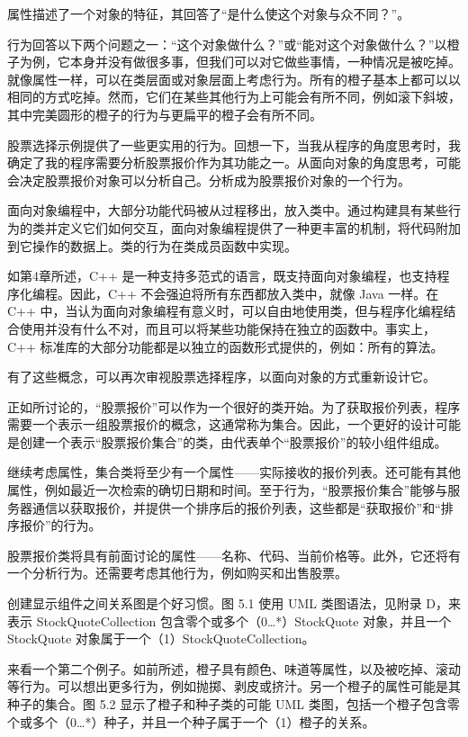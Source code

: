 属性描述了一个对象的特征，其回答了“是什么使这个对象与众不同？”。


行为回答以下两个问题之一：“这个对象做什么？”或“能对这个对象做什么？”以橙子为例，它本身并没有做很多事，但我们可以对它做些事情，一种情况是被吃掉。就像属性一样，可以在类层面或对象层面上考虑行为。所有的橙子基本上都可以以相同的方式吃掉。然而，它们在某些其他行为上可能会有所不同，例如滚下斜坡，其中完美圆形的橙子的行为与更扁平的橙子会有所不同。

股票选择示例提供了一些更实用的行为。回想一下，当我从程序的角度思考时，我确定了我的程序需要分析股票报价作为其功能之一。从面向对象的角度思考，可能会决定股票报价对象可以分析自己。分析成为股票报价对象的一个行为。

面向对象编程中，大部分功能代码被从过程移出，放入类中。通过构建具有某些行为的类并定义它们如何交互，面向对象编程提供了一种更丰富的机制，将代码附加到它操作的数据上。类的行为在类成员函数中实现。

如第4章所述，C++ 是一种支持多范式的语言，既支持面向对象编程，也支持程序化编程。因此，C++ 不会强迫将所有东西都放入类中，就像 Java 一样。在 C++ 中，当认为面向对象编程有意义时，可以自由地使用类，但与程序化编程结合使用并没有什么不对，而且可以将某些功能保持在独立的函数中。事实上，C++ 标准库的大部分功能都是以独立的函数形式提供的，例如：所有的算法。


有了这些概念，可以再次审视股票选择程序，以面向对象的方式重新设计它。

正如所讨论的，“股票报价”可以作为一个很好的类开始。为了获取报价列表，程序需要一个表示一组股票报价的概念，这通常称为集合。因此，一个更好的设计可能是创建一个表示“股票报价集合”的类，由代表单个“股票报价”的较小组件组成。

继续考虑属性，集合类将至少有一个属性——实际接收的报价列表。还可能有其他属性，例如最近一次检索的确切日期和时间。至于行为，“股票报价集合”能够与服务器通信以获取报价，并提供一个排序后的报价列表，这些都是“获取报价”和“排序报价”的行为。

股票报价类将具有前面讨论的属性——名称、代码、当前价格等。此外，它还将有一个分析行为。还需要考虑其他行为，例如购买和出售股票。

创建显示组件之间关系图是个好习惯。图 5.1 使用 UML 类图语法，见附录 D，来表示 StockQuoteCollection 包含零个或多个（0…*）StockQuote 对象，并且一个 StockQuote 对象属于一个（1）StockQuoteCollection。


来看一个第二个例子。如前所述，橙子具有颜色、味道等属性，以及被吃掉、滚动等行为。可以想出更多行为，例如抛掷、剥皮或挤汁。另一个橙子的属性可能是其种子的集合。图 5.2 显示了橙子和种子类的可能 UML 类图，包括一个橙子包含零个或多个（0…*）种子，并且一个种子属于一个（1）橙子的关系。

























